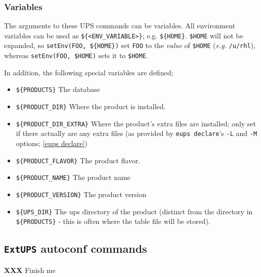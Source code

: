 \documentclass{article}
\newcommand{\XXX}[1]{\textbf{XXX} #1}
\newcommand{\code}[1]{\texttt{#1}}
\newcommand{\eups}{\code{ExtUPS}\xspace}
\begin{document}
\subsubsection{Variables}

The arguments to these UPS commands can be variables. All environment
variables can be used as \code{\$\{<ENV\_VARIABLE>\}}; e.g. \code{\$\{HOME\}}.
\code{\$HOME} will not be expanded, so \code{setEnv(FOO, \$\{HOME\})}
set \code{FOO} to the \textit{value} of \code{\$HOME} (\textit{e.g.} \code{/u/rhl}), whereas
\code{setEnv(FOO, \$HOME)} sets it to \code{\$HOME}.

In addition, the following special variables are defined;

\begin{itemize}
  \item \code{\$\{PRODUCTS\}}
    The database
    
  \item \code{\$\{PRODUCT\_DIR\}}
    Where the product is installed.
    
  \item \code{\$\{PRODUCT\_DIR\_EXTRA\}}
    Where the product's extra files are installed; only set if there actually are
    any extra files (as provided by \code{eups declare}'s \code{-L} and \code{-M} options;
    \ref{eups declare})
    
  \item \code{\$\{PRODUCT\_FLAVOR\}}
    The product flavor.
    
  \item \code{\$\{PRODUCT\_NAME\}}
    The product name
    
  \item \code{\$\{PRODUCT\_VERSION\}}
    The product version
    
  \item \code{\$\{UPS\_DIR\}}
    The ups directory of the product (distinct from the directory
    in \code{\$\{PRODUCTS\}} - this is often where the table file will be stored).
\end{itemize}

\subsection{\eups autoconf commands}
\label{autoconfReference}

\XXX{Finish me}
\end{document}
